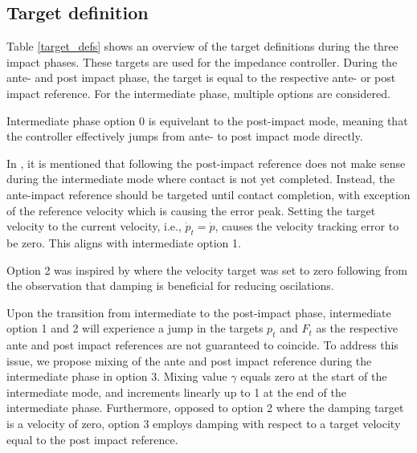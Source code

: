 \documentclass[a4paper, 10pt, conference]{ieeeconf}
\begin{document}
    \subsection{Target definition}
    Table \ref{target_defs} shows an overview of the target definitions during the three impact phases. These targets are used for the impedance controller. During the ante- and post impact phase, the target is equal to the respective ante- or post impact reference. For the intermediate phase, multiple options are considered.

    Intermediate phase option 0 is equivelant to the post-impact mode, meaning that the controller effectively jumps from ante- to post impact mode directly.

    In \cite{vansteenRobotControlSimultaneous2021}, it is mentioned that following the post-impact reference does not make sense during the intermediate mode where contact is not yet completed. Instead, the ante-impact reference should be targeted until contact completion, with exception of the reference velocity which is causing the error peak. Setting the target velocity to the current velocity, i.e., $\dot{p}_t=\dot{p}$, causes the velocity tracking error to be zero. This aligns with intermediate option 1.

    Option 2 was inspired by \cite{uitendaalTeachingRobotsInteraction2022} where the velocity target was set to zero following from the observation that damping is beneficial for reducing oscilations. 

    Upon the transition from intermediate to the post-impact phase, intermediate option 1 and 2 will experience a jump in the targets $p_t$ and $F_t$ as the respective ante and post impact references are not guaranteed to coincide. To address this issue, we propose mixing of the ante and post impact reference during the intermediate phase in option 3. Mixing value $\gamma$ equals zero at the start of the intermediate mode, and increments linearly up to 1 at the end of the intermediate phase. Furthermore, opposed to option 2 where the damping target is a velocity of zero, option 3 employs damping with respect to a target velocity equal to the post impact reference.
\end{document}
